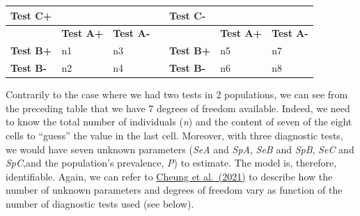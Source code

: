 \documentclass[
]{book}
\begin{document}
\begin{longtable}[]{@{}
  >{\centering\arraybackslash}p{}
  >{\centering\arraybackslash}p{}
  >{\centering\arraybackslash}p{}
  >{\centering\arraybackslash}p{}
  >{\centering\arraybackslash}p{}
  >{\centering\arraybackslash}p{}
  >{\centering\arraybackslash}p{}@{}}
\toprule\noalign{}
\begin{minipage}[b]{\linewidth}\centering
\textbf{Test C+}
\end{minipage} & \begin{minipage}[b]{\linewidth}\centering
\end{minipage} & \begin{minipage}[b]{\linewidth}\centering
\end{minipage} & \begin{minipage}[b]{\linewidth}\centering
\end{minipage} & \begin{minipage}[b]{\linewidth}\centering
\textbf{Test C-}
\end{minipage} & \begin{minipage}[b]{\linewidth}\centering
\end{minipage} & \begin{minipage}[b]{\linewidth}\centering
\end{minipage} \\
\midrule\noalign{}
\endhead
\bottomrule\noalign{}
\endlastfoot
& \textbf{Test A+} & \textbf{Test A-} & & & \textbf{Test A+} & \textbf{Test A-} \\
\textbf{Test B+} & n1 & n3 & & \textbf{Test B+} & n5 & n7 \\
\textbf{Test B-} & n2 & n4 & & \textbf{Test B-} & n6 & n8 \\
\end{longtable}

Contrarily to the case where we had two tests in 2 populations, we can see from the preceding table that we have 7 degrees of freedom available. Indeed, we need to know the total number of individuals (\emph{n}) and the content of seven of the eight cells to ``guess'' the value in the last cell. Moreover, with three diagnostic tests, we would have seven unknown parameters (\emph{SeA} and \emph{SpA}, \emph{SeB} and \emph{SpB}, \emph{SeC} and \emph{SpC},and the population's prevalence, \emph{P}) to estimate. The model is, therefore, identifiable. Again, we can refer to \href{https://doi.org/10.20506/rst.40.1.3224}{Cheung et al.~(2021)} to describe how the number of unknown parameters and degrees of freedom vary as function of the number of diagnostic tests used (see below).
\end{document}
